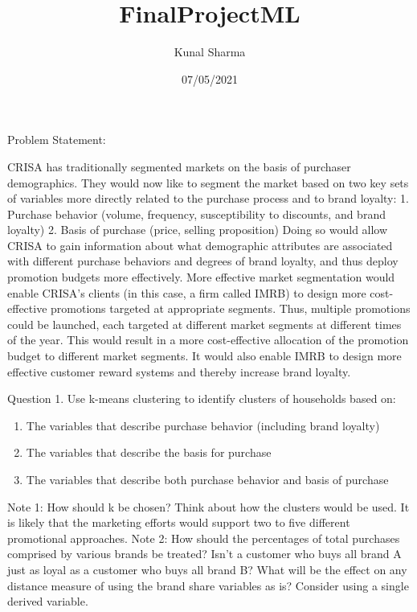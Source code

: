 \documentclass[
]{article}
\title{FinalProjectML}
\author{Kunal Sharma}
\date{07/05/2021}
\begin{document}
\maketitle

Problem Statement:

CRISA has traditionally segmented markets on the basis of purchaser
demographics. They would now like to segment the market based on two key
sets of variables more directly related to the purchase process and to
brand loyalty: 1. Purchase behavior (volume, frequency, susceptibility
to discounts, and brand loyalty) 2. Basis of purchase (price, selling
proposition) Doing so would allow CRISA to gain information about what
demographic attributes are associated with different purchase behaviors
and degrees of brand loyalty, and thus deploy promotion budgets more
effectively. More effective market segmentation would enable CRISA's
clients (in this case, a firm called IMRB) to design more cost-effective
promotions targeted at appropriate segments. Thus, multiple promotions
could be launched, each targeted at different market segments at
different times of the year. This would result in a more cost-effective
allocation of the promotion budget to different market segments. It
would also enable IMRB to design more effective customer reward systems
and thereby increase brand loyalty.

Question 1. Use k-means clustering to identify clusters of households
based on:

\begin{enumerate}
\def\labelenumi{\alph{enumi}.}
\item
  The variables that describe purchase behavior (including brand
  loyalty)
\item
  The variables that describe the basis for purchase
\item
  The variables that describe both purchase behavior and basis of
  purchase
\end{enumerate}

Note 1: How should k be chosen? Think about how the clusters would be
used. It is likely that the marketing efforts would support two to five
different promotional approaches. Note 2: How should the percentages of
total purchases comprised by various brands be treated? Isn't a customer
who buys all brand A just as loyal as a customer who buys all brand B?
What will be the effect on any distance measure of using the brand share
variables as is? Consider using a single derived variable.
\end{document}

